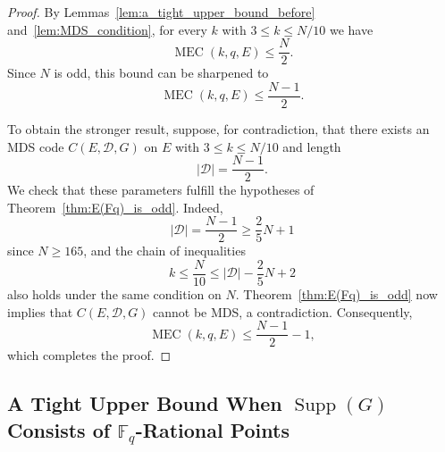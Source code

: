 \documentclass[journal,12pt,onecolumn]{IEEEtran}
\begin{document}
\begin{proof}
By Lemmas~\ref{lem:a_tight_upper_bound_before} and~\ref{lem:MDS_condition}, for every $k$ with $3 \le k \le N/10$ we have
\[
\operatorname{MEC}(k, q, E) \le \frac{N}{2}.
\]
Since $N$ is odd, this bound can be sharpened to
\[
\operatorname{MEC}(k, q, E) \le \frac{N - 1}{2}.
\]

To obtain the stronger result, suppose, for contradiction, that there exists an MDS code $C(E, \mathcal{D}, G)$ on $E$ with $3 \le k \le N/10$ and length
\[
|\mathcal{D}| = \frac{N - 1}{2}.
\]
We check that these parameters fulfill the hypotheses of Theorem~\ref{thm:E(Fq)_is_odd}. Indeed,
\[
|\mathcal{D}| = \frac{N - 1}{2} \ge \frac{2}{5}N + 1
\]
since $N \ge 165$, and the chain of inequalities
\[
k \le \frac{N}{10} \le |\mathcal{D}| - \frac{2}{5}N + 2
\]
also holds under the same condition on $N$. Theorem~\ref{thm:E(Fq)_is_odd} now implies that $C(E, \mathcal{D}, G)$ cannot be MDS, a contradiction. Consequently,
\[
\operatorname{MEC}(k, q, E) \le \frac{N - 1}{2} - 1,
\]
which completes the proof.
\end{proof}

\subsection{A Tight Upper Bound When $\operatorname{Supp}(G)$ Consists of $\mathbb{F}_q$-Rational Points}
\end{document}
